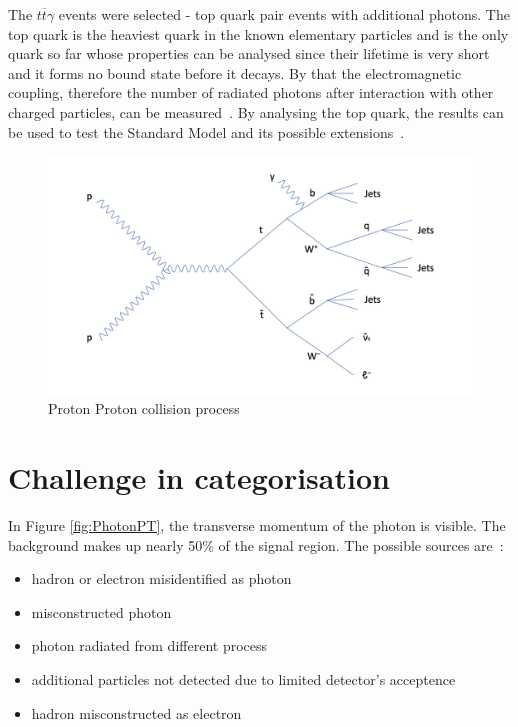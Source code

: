 \documentclass[11pt]{scrartcl}
\begin{document}
	The $t\overline{t}\gamma$ events were selected - top quark pair events with additional photons. The top quark is the heaviest quark in the known elementary particles and is the only quark so far whose properties can be analysed since their lifetime is very short and it forms no bound state before it decays. By that the electromagnetic coupling, therefore the number of radiated photons after interaction with other charged particles, can be measured~\cite{TTG}. By analysing the top quark, the results can be used to test the Standard Model and its possible extensions~\cite{ATLAS}.
	
	\begin{figure}[H]
	\centering
	\includegraphics[width=1\textwidth]{figures/PP_process.png}
	\caption{Proton Proton collision process}
 	\label{fig:PPprocess}
	\end{figure}
	
\section{Challenge in categorisation}

In Figure \ref{fig:PhotonPT}, the transverse momentum of the photon is visible. The background makes up nearly 50\% of the signal region. The possible sources are~\cite{ATLAS, TTG}:
\begin{itemize}
  \item hadron or electron misidentified as photon
  \item misconstructed photon
  \item photon radiated from different process
  \item additional particles not detected due to limited detector's acceptence
  \item hadron misconstructed as electron
\end{itemize}
\end{document}
